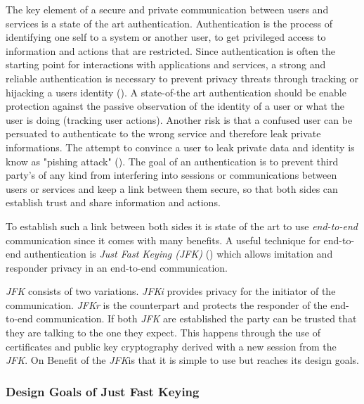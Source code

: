  The key element of a secure and private communication between users and services is a state of the art authentication. Authentication is the process of identifying one self to a system or another user, to get privileged access to information and actions that are restricted. Since authentication is often the starting point for interactions with applications and services, a strong and reliable authentication is necessary to prevent privacy threats through tracking or hijacking a users identity (\cite{danezis2015privacy}). A state-of-the art authentication should be enable protection against the passive observation of the identity of a user or what the user is doing (tracking user actions). Another risk is that a confused user can be persuated to authenticate to the wrong service and therefore leak private informations. The attempt to convince a user to leak private data and identity is know as "pishing attack" (\cite{dhamija2006phishing}).
 The goal of an authentication is to prevent third party's of any kind from interfering into sessions or communications between users or services and keep a link between them secure, so that both sides can establish trust and share information and actions.


 To establish such a link between both sides it is state of the art to use \textit{end-to-end} communication since it comes with many benefits. A useful technique for end-to-end authentication is \textit{Just Fast Keying (JFK)} (\cite{aiello2004just}) which allows imitation and responder privacy in an end-to-end communication.


\textit{JFK} consists of two variations. \textit{JFKi} provides privacy for the initiator of the communication. \textit{JFKr} is the counterpart and protects the responder of the end-to-end communication. If both \textit{JFK} are established the party can be trusted that they are talking to the one they expect. This happens through the use of certificates and public key cryptography derived with a new session from the \textit{JFK}. On Benefit of the \textit{JFK}is that it is simple to use but reaches its design goals.

\subsubsection{Design Goals of Just Fast Keying}

